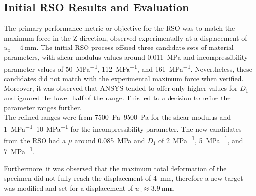 \subsection*{Initial RSO Results and Evaluation}
The primary performance metric or objective for the RSO was to match the maximum force in the Z-direction, 
observed experimentally at a displacement of $u_z=\SI{4}{\milli\meter}$.
The initial RSO process offered three candidate sets of material parameters, with shear modulus values 
around \SI{0.011}{\mega \pascal} and incompressibility parameter values of \SI{50}{\mega\pascal\tothe{-1}}, 
\SI{112}{\mega\pascal\tothe{-1}}, and \SI{161}{\mega\pascal\tothe{-1}}. Nevertheless, these candidates 
did not match with the experimental maximum force when verified. Moreover, it was observed that ANSYS 
tended to offer only higher values for $D_1$ and ignored the lower half of the range. This led to a decision to 
refine the parameter ranges further.\\

The refined ranges were from \SIrange{7500}{9500}{\pascal} for the shear modulus and 
\SIrange{1}{10}{\mega\pascal\tothe{-1}} for the incompressibility parameter. The new candidates from the RSO had a 
$\mu$ around \SI{0.085}{\mega \pascal} and $D_1$ of \SI{2}{\mega\pascal\tothe{-1}}, 
\SI{5}{\mega\pascal\tothe{-1}}, and \SI{7}{\mega\pascal\tothe{-1}}. 

Furthermore, it was observed that the maximum total deformation of the specimen did not fully reach the  
displacement of \SI{4}{\milli\meter}, therefore a new target was modified and set for a displacement 
of $u_z\approx\SI{3.9}{\milli\meter}$.


